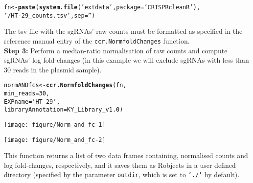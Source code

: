 \documentclass{article}\usepackage[]{graphicx}\usepackage[]{color}
\makeatletter
\def\maxwidth{ %
  \ifdim\Gin@nat@width>\linewidth
    \linewidth
  \else
    \Gin@nat@width
  \fi
}
\newcommand{\hlnum}[1]{\textcolor[rgb]{0.686,0.059,0.569}{#1}}%
\newcommand{\hlstr}[1]{\textcolor[rgb]{0.192,0.494,0.8}{#1}}%
\newcommand{\hlstd}[1]{\textcolor[rgb]{0.345,0.345,0.345}{#1}}%
\newcommand{\hlkwb}[1]{\textcolor[rgb]{0.69,0.353,0.396}{#1}}%
\newcommand{\hlkwc}[1]{\textcolor[rgb]{0.333,0.667,0.333}{#1}}%
\newcommand{\hlkwd}[1]{\textcolor[rgb]{0.737,0.353,0.396}{\textbf{#1}}}%
\newenvironment{kframe}{%
 \def\at@end@of@kframe{}%
 \ifinner\ifhmode%
  \def\at@end@of@kframe{\end{minipage}}%
  \begin{minipage}{\columnwidth}%
 \fi\fi%
 \def\FrameCommand##1{\hskip\@totalleftmargin \hskip-\fboxsep
 \colorbox{shadecolor}{##1}\hskip-\fboxsep
     \hskip-\linewidth \hskip-\@totalleftmargin \hskip\columnwidth}%
 \MakeFramed {\advance\hsize-\width
   \@totalleftmargin\z@ \linewidth\hsize
   \@setminipage}}%
 {\par\unskip\endMakeFramed%
 \at@end@of@kframe}
\newenvironment{knitrout}{}{} %
\makeatother
\begin{document}
\begin{knitrout}
\color{fgcolor}\begin{kframe}
\begin{alltt}
 \hlstd{fn}\hlkwb{<-}\hlkwd{paste}\hlstd{(}\hlkwd{system.file}\hlstd{(}\hlstr{'extdata'}\hlstd{,}\hlkwc{package} \hlstd{=} \hlstr{'CRISPRcleanR'}\hlstd{),}
           \hlstr{'/HT-29_counts.tsv'}\hlstd{,}\hlkwc{sep}\hlstd{=}\hlstr{''}\hlstd{)}
\end{alltt}
\end{kframe}
\end{knitrout}

The tsv file with the sgRNAs' raw counts must be formatted as specified in the reference manual entry of the \texttt{ccr.NormfoldChanges} function.\\
 
\textbf{Step 3:} Perform a median-ratio normalisation of raw counts and compute sgRNAs' log fold-changes (in this example we will exclude sgRNAs with less than 30 reads in the plasmid sample).

\begin{knitrout}
\color{fgcolor}\begin{kframe}
\begin{alltt}
\hlstd{normANDfcs}\hlkwb{<-}\hlkwd{ccr.NormfoldChanges}\hlstd{(fn,}
                                 \hlkwc{min_reads}\hlstd{=}\hlnum{30}\hlstd{,}
                                 \hlkwc{EXPname}\hlstd{=}\hlstr{'HT-29'}\hlstd{,}
                                 \hlkwc{libraryAnnotation}\hlstd{=KY_Library_v1.0)}
\end{alltt}
\end{kframe}
\texttt{[image: figure/Norm\_and\_fc-1]} 

\texttt{[image: figure/Norm\_and\_fc-2]} 

\end{knitrout}

This function returns a list of two data frames containing, normalised counts and log fold-changes, respectively, and it saves them as Robjects in a user defined directory (specified by the parameter \texttt{outdir}, which is set to \texttt{'./'} by default).
\end{document}
